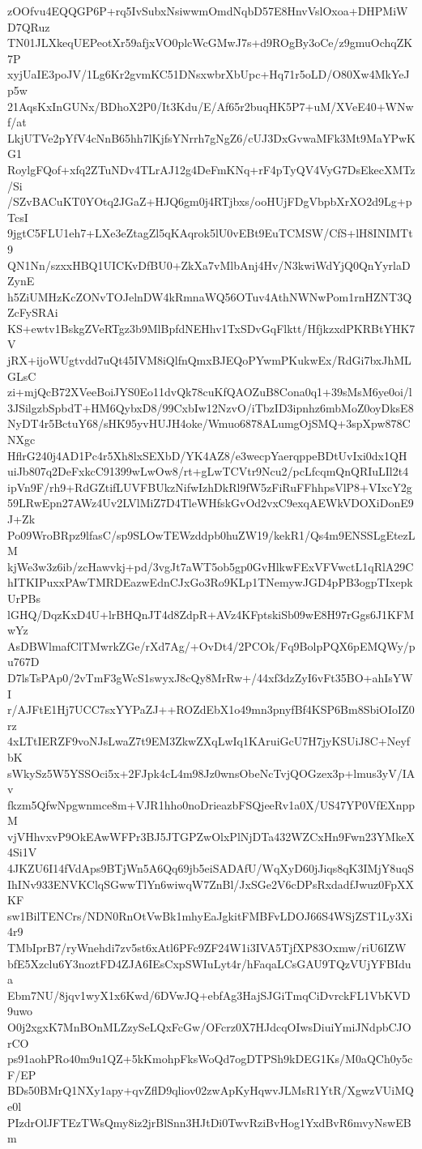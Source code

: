 zOOfvu4EQQGP6P+rq5IvSubxNsiwwmOmdNqbD57E8HnvVslOxoa+DHPMiWD7QRuz
TN01JLXkeqUEPeotXr59afjxVO0plcWcGMwJ7s+d9ROgBy3oCe/z9gmuOchqZK7P
xyjUaIE3poJV/1Lg6Kr2gvmKC51DNsxwbrXbUpc+Hq71r5oLD/O80Xw4MkYeJp5w
21AqsKxInGUNx/BDhoX2P0/It3Kdu/E/Af65r2buqHK5P7+uM/XVeE40+WNwf/at
LkjUTVe2pYfV4cNnB65hh7lKjfsYNrrh7gNgZ6/cUJ3DxGvwaMFk3Mt9MaYPwKG1
RoylgFQof+xfq2ZTuNDv4TLrAJ12g4DeFmKNq+rF4pTyQV4VyG7DsEkecXMTz/Si
/SZvBACuKT0YOtq2JGaZ+HJQ6gm0j4RTjbxs/ooHUjFDgVbpbXrXO2d9Lg+pTcsI
9jgtC5FLU1eh7+LXe3eZtagZl5qKAqrok5lU0vEBt9EuTCMSW/CfS+lH8INIMTt9
QN1Nn/szxxHBQ1UICKvDfBU0+ZkXa7vMlbAnj4Hv/N3kwiWdYjQ0QnYyrlaDZynE
h5ZiUMHzKcZONvTOJelnDW4kRmnaWQ56OTuv4AthNWNwPom1rnHZNT3QZcFySRAi
KS+ewtv1BskgZVeRTgz3b9MlBpfdNEHhv1TxSDvGqFlktt/HfjkzxdPKRBtYHK7V
jRX+ijoWUgtvdd7uQt45IVM8iQlfnQmxBJEQoPYwmPKukwEx/RdGi7bxJhMLGLsC
zi+mjQcB72XVeeBoiJYS0Eo11dvQk78cuKfQAOZuB8Cona0q1+39sMsM6ye0oi/l
3JSilgzbSpbdT+HM6QybxD8/99CxbIw12NzvO/iTbzID3ipnhz6mbMoZ0oyDksE8
NyDT4r5BctuY68/sHK95yvHUJH4oke/Wmuo6878ALumgOjSMQ+3spXpw878CNXgc
HflrG240j4AD1Pc4r5Xh8lxSEXbD/YK4AZ8/e3wecpYaerqppeBDtUvIxi0dx1QH
uiJb807q2DeFxkcC91399wLwOw8/rt+gLwTCVtr9Ncu2/pcLfcqmQnQRIuLIl2t4
ipVn9F/rh9+RdGZtifLUVFBUkzNifwIzhDkRl9fW5zFiRuFFhhpsVlP8+VIxcY2g
59LRwEpn27AWz4Uv2LVlMiZ7D4TleWHfskGvOd2vxC9exqAEWkVDOXiDonE9J+Zk
Po09WroBRpz9lfasC/sp9SLOwTEWzddpb0huZW19/kekR1/Qs4m9ENSSLgEtezLM
kjWe3w3z6ib/zcHawvkj+pd/3vgJt7aWT5ob5gp0GvHlkwFExVFVwctL1qRlA29C
hITKIPuxxPAwTMRDEazwEdnCJxGo3Ro9KLp1TNemywJGD4pPB3ogpTIxepkUrPBs
lGHQ/DqzKxD4U+lrBHQnJT4d8ZdpR+AVz4KFptskiSb09wE8H97rGgs6J1KFMwYz
AsDBWlmafClTMwrkZGe/rXd7Ag/+OvDt4/2PCOk/Fq9BolpPQX6pEMQWy/pu767D
D7lsTsPAp0/2vTmF3gWcS1swyxJ8cQy8MrRw+/44xf3dzZyI6vFt35BO+ahIsYWI
r/AJFtE1Hj7UCC7sxYYPaZJ++ROZdEbX1o49mn3pnyfBf4KSP6Bm8SbiOIoIZ0rz
4xLTtIERZF9voNJsLwaZ7t9EM3ZkwZXqLwIq1KAruiGcU7H7jyKSUiJ8C+NeyfbK
sWkySz5W5YSSOci5x+2FJpk4cL4m98Jz0wnsObeNcTvjQOGzex3p+lmus3yV/IAv
fkzm5QfwNpgwnmce8m+VJR1hho0noDrieazbFSQjeeRv1a0X/US47YP0VfEXnppM
vjVHhvxvP9OkEAwWFPr3BJ5JTGPZwOlxPlNjDTa432WZCxHn9Fwn23YMkeX4Si1V
4JKZU6I14fVdAps9BTjWn5A6Qq69jb5eiSADAfU/WqXyD60jJiqs8qK3IMjY8uqS
IhINv933ENVKClqSGwwTlYn6wiwqW7ZnBl/JxSGe2V6cDPsRxdadfJwuz0FpXXKF
sw1BilTENCrs/NDN0RnOtVwBk1mhyEaJgkitFMBFvLDOJ66S4WSjZST1Ly3Xi4r9
TMbIprB7/ryWnehdi7zv5st6xAtl6PFc9ZF24W1i3IVA5TjfXP83Oxmw/riU6IZW
bfE5Xzclu6Y3noztFD4ZJA6IEsCxpSWIuLyt4r/hFaqaLCsGAU9TQzVUjYFBIdua
Ebm7NU/8jqv1wyX1x6Kwd/6DVwJQ+ebfAg3HajSJGiTmqCiDvrckFL1VbKVD9uwo
O0j2xgxK7MnBOnMLZzySeLQxFcGw/OFcrz0X7HJdcqOIwsDiuiYmiJNdpbCJOrCO
ps91aohPRo40m9u1QZ+5kKmohpFksWoQd7ogDTPSh9kDEG1Ks/M0aQCh0y5cF/EP
BDs50BMrQ1NXy1apy+qvZflD9qliov02zwApKyHqwvJLMsR1YtR/XgwzVUiMQe0l
PIzdrOlJFTEzTWsQmy8iz2jrBlSnn3HJtDi0TwvRziBvHog1YxdBvR6mvyNswEBm
